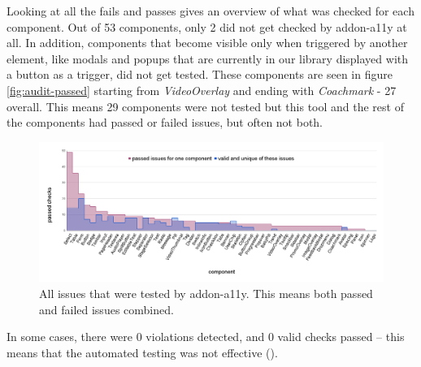 \documentclass{master_thesis}
\begin{document}
Looking at all the fails and passes gives an overview of what was checked for each component. Out of 53 components, only 2 did not get checked by addon-a11y at all. In addition, components that become visible only when triggered by another element, like modals and popups that are currently in our library displayed with a button as a trigger, did not get tested.  These components are seen in figure \ref{fig:audit-passed} starting from \textit{VideoOverlay} and ending with \textit{Coachmark} - 27 overall. This means 29 components were not tested but this tool and the rest of the components had passed or failed issues, but often not both.

\begin{figure}[H]
	\includegraphics[width=\textwidth]{img/audit-all.png}
	\caption{All issues that were tested by addon-a11y. This means both passed and failed issues combined.}
	\label{fig:audit-all}
\end{figure}

In some cases, there were 0 violations detected, and 0 valid checks passed – this means that the automated testing was not effective ().
\end{document}
